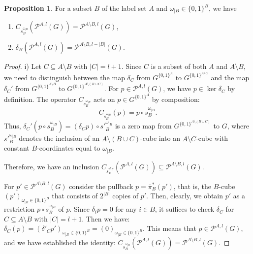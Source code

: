 \documentclass{amsart}
\theoremstyle{definition}
\newtheorem{proposition}[theorem]{Proposition}
\theoremstyle{remark}
\numberwithin{equation}{section}
\begin{document}
\begin{proposition}
\label{prop:dBshift}
For a subset $B$ of the label set $A$ and $\omega_{|B} \in \{0,1\}^B$, we have 
\renewcommand{\labelenumi}{\roman{enumi})}
\begin{enumerate}
    
\item $ C_{s_{B}^{\omega_{|B}}} \left(\mathcal{P}^{A,l}(G)\right) = \mathcal{P}^{A\setminus B,l}(G)$,

\item $ \delta_B \left(\mathcal{P}^{A,l}(G)\right) = \mathcal{P}^{A\setminus B,l -|B|}(G)$.
\end{enumerate}
\end{proposition}
\begin{proof} 
i) Let $C \subseteq A\setminus B$ with $|C|=l+1$. Since $C$ is a subset of both $A$ and $A\setminus B$, we need to distinguish between the map $\delta_C$  from $G^{\{0,1\}^A}$ to $G^{\{0,1\}^{A \setminus C}}$ and the map $\delta_C'$ from $G^{\{0,1\}^{A\setminus B}}$ to $G^{\{0,1\}^{A \setminus (B \cup C)}}$. 
For $p \in \mathcal{P}^{A,l}(G)$, we have $p \in \ker \delta_C$ by definition.  The operator $C_{s_{B}^{\omega_{|B}}}$ acts on $p \in G^{\{0,1\}^A}$ by composition:
$$C_{s_{B}^{\omega_{|B}}}(p) = p \circ s_{B}^{\omega_{|B}}.$$
Thus, $ \delta_C' (p \circ s_{B}^{\omega_{|B}}) = (\delta_C p )\circ {s'}_{B}^{\omega_{|B}} $  is a zero map from $G^{\{0,1\}^{A \setminus (B \cup C)}}$
to $G$, where ${s'}_{B}^{\omega_{|B}}$ denotes the inclusion of an ${A \setminus (B \cup C)}$-cube into an ${A \setminus C}$-cube with constant $B$-coordinates equal to $\omega_{|B}$.

Therefore, we have an inclusion $C_{s_{B}^{\omega_{|B}}} \left(\mathcal{P}^{A,l}(G)\right) \subseteq \mathcal{P}^{A\setminus B,l}(G)$.

For $p' \in \mathcal{P}^{A\setminus B,l}(G)$ consider the pullback $p=\bar \pi_B^*(p')$, that is, the $B$-cube $(p')_{\omega_{|B} \in \{0,1\}^B}$ that consists of $2^{|B|}$ copies of $p'$. Then, clearly, we obtain $p'$ as a restriction $p \circ s_{B}^{\omega_{|B}}$ of $p$. Since $\delta_i p = 0$ for any $i \in B$, it suffices to check $\delta_C$ for $C \subseteq A \setminus B$ with $|C|=l+1$. Then we have:
$\delta_C(p)=(\delta'_C p')_{\omega_{|B} \in \{0,1\}^B} = (0)_{\omega_{|B} \in \{0,1\}^B}$. This means that $p \in \mathcal{P}^{A,l}(G)$, and we have established the identity: $ C_{s_{B}^{\omega_{|B}}} \left(\mathcal{P}^{A,l}(G)\right) = \mathcal{P}^{A\setminus B,l}(G)$.




\end{proof}
\end{document}
